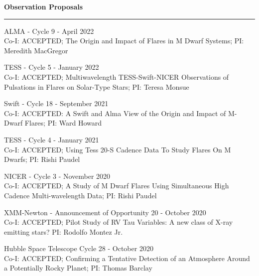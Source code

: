 \documentclass[letter,11pt]{article}
\begin{document}
\newpage
\noindent
{\bf Observation Proposals} \\
\vspace{-10mm}
\begin{center}
\rule{\textwidth}{0.2mm}
\end{center}
\vspace{-3mm}
\noindent
\begin{etaremune}
\renewcommand\labelenumi{\bfseries\theenumi .}

\item ALMA - Cycle 9 - April 2022 \\
Co-I: ACCEPTED; The Origin and Impact of Flares in M Dwarf Systems; PI: Meredith MacGregor

\item TESS - Cycle 5 - January 2022 \\
Co-I: ACCEPTED; Multiwavelength TESS-Swift-NICER Observations of Pulsations in Flares on Solar-Type Stars; PI: Teresa Monsue

\item Swift - Cycle 18 - September 2021 \\
Co-I: ACCEPTED: A Swift and Alma View of the Origin and Impact of M-Dwarf Flares; PI: Ward Howard

\item TESS - Cycle 4 - January 2021 \\
Co-I: ACCEPTED; Using Tess 20-S Cadence Data To Study Flares On M Dwarfs; PI: Rishi Paudel

\item NICER - Cycle 3 - November 2020 \\
Co-I: ACCEPTED; A Study of M Dwarf Flares Using Simultaneous High Cadence Multi-wavelength Data; PI: Rishi Paudel

\item XMM-Newton - Announcement of Opportunity 20 - October 2020 \\
Co-I: ACCEPTED; Pilot Study of RV Tau Variables: A new class of X-ray emitting stars? PI: Rodolfo Montez Jr.


\item Hubble Space Telescope Cycle 28 - October 2020 \\
Co-I: ACCEPTED; Confirming a Tentative Detection of an Atmosphere Around a Potentially Rocky Planet; PI: Thomas Barclay


\end{etaremune}
\end{document}
